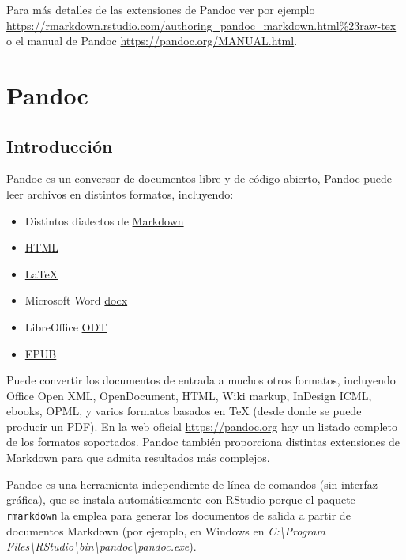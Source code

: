 \documentclass[
]{book}
\theoremstyle{definition}
\theoremstyle{definition}
\theoremstyle{definition}
\theoremstyle{definition}
\theoremstyle{remark}
\begin{document}
Para más detalles de las extensiones de Pandoc ver por ejemplo
\url{https://rmarkdown.rstudio.com/authoring_pandoc_markdown.html\%23raw-tex}
o el manual de Pandoc \url{https://pandoc.org/MANUAL.html}.

\hypertarget{pandoc}{%
\chapter{Pandoc}\label{pandoc}}

\hypertarget{introducciuxf3n-2}{%
\section{Introducción}\label{introducciuxf3n-2}}

Pandoc es un conversor de documentos libre y de código abierto,
Pandoc puede leer archivos en distintos formatos, incluyendo:

\begin{itemize}
\item
  Distintos dialectos de \href{http://daringfireball.net/projects/markdown/}{Markdown}
\item
  \href{http://www.w3.org/TR/html40/}{HTML}
\item
  \href{http://www.latex-project.org/}{LaTeX}
\item
  Microsoft Word \href{https://en.wikipedia.org/wiki/Office_Open_XML}{docx}
\item
  LibreOffice \href{http://en.wikipedia.org/wiki/OpenDocument}{ODT}
\item
  \href{http://en.wikipedia.org/wiki/EPUB}{EPUB}
\end{itemize}

Puede convertir los documentos de entrada a muchos otros formatos, incluyendo Office Open XML, OpenDocument, HTML, Wiki markup, InDesign ICML, ebooks, OPML, y varios formatos basados en TeX (desde donde se puede producir un PDF).
En la web oficial \url{https://pandoc.org} hay un listado completo de los formatos soportados.
Pandoc también proporciona distintas extensiones de Markdown para que admita resultados más complejos.

Pandoc es una herramienta independiente de línea de comandos (sin interfaz gráfica), que se instala automáticamente con RStudio porque el paquete \texttt{rmarkdown} la emplea para generar los documentos de salida a partir de documentos Markdown
(por ejemplo, en Windows en \emph{C:\textbackslash Program Files\textbackslash RStudio\textbackslash bin\textbackslash pandoc\textbackslash pandoc.exe}).
\end{document}
